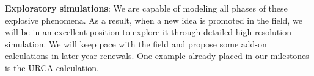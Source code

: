 {\bf Exploratory simulations}:
%
We are
capable of modeling all phases of these explosive phenomena.  As a
result, when a new idea is promoted in the field, we will be in an
excellent position to explore it through detailed high-resolution
simulation.  We will keep pace with the field and propose some add-on
calculations in later year renewals.  One example already placed in
our milestones is the URCA calculation.



